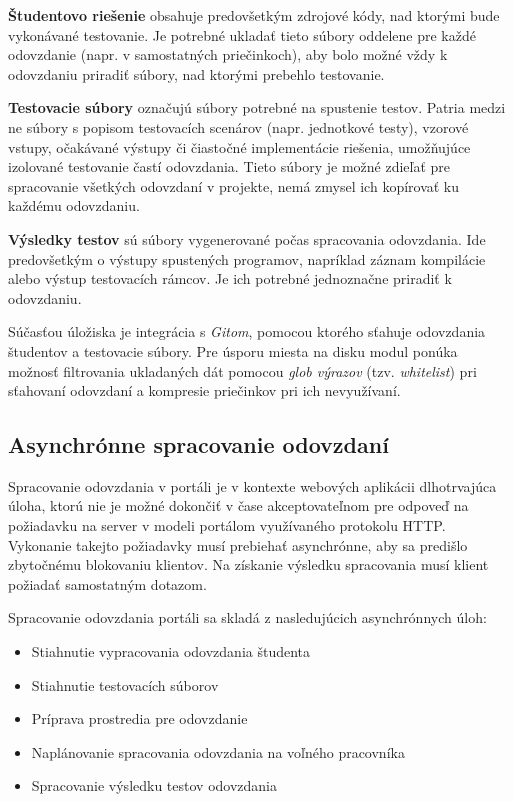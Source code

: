 \documentclass[
  digital, %
  twoside, %
  table,   %
  lof,     %
  lot,     %
]{fithesis3}
\begin{document}
\textbf{Študentovo riešenie} obsahuje predovšetkým zdrojové kódy, nad ktorými bude vykonávané testovanie. Je potrebné ukladať tieto súbory oddelene pre každé odovzdanie (napr. v samostatných priečinkoch), aby bolo možné vždy k odovzdaniu priradiť súbory, nad ktorými prebehlo testovanie.

\textbf{Testovacie súbory} označujú súbory potrebné na spustenie testov. Patria medzi ne súbory s popisom testovacích scenárov (napr. jednotkové testy), vzorové vstupy, očakávané výstupy či čiastočné implementácie riešenia, umožňujúce izolované testovanie častí odovzdania. Tieto súbory je možné zdieľať pre spracovanie všetkých odovzdaní v projekte, nemá zmysel ich kopírovať ku každému odovzdaniu.

\textbf{Výsledky testov} sú súbory vygenerované počas spracovania odovzdania. Ide predovšetkým o výstupy spustených programov, napríklad záznam kompilácie alebo výstup testovacích rámcov. Je ich potrebné jednoznačne priradiť k odovzdaniu.

Súčasťou úložiska je integrácia s \emph{Gitom}, pomocou ktorého sťahuje odovzdania študentov a testovacie súbory. Pre úsporu miesta na disku modul ponúka možnosť filtrovania ukladaných dát pomocou \emph{glob výrazov} (tzv. \emph{whitelist}) pri sťahovaní odovzdaní a kompresie priečinkov pri ich nevyužívaní.

\subsection{Asynchrónne spracovanie odovzdaní}

Spracovanie odovzdania v portáli je v kontexte webových aplikácii dlhotrvajúca úloha, ktorú nie je možné dokončiť v čase akceptovateľnom pre odpoveď na požiadavku na server v modeli portálom využívaného protokolu HTTP. Vykonanie takejto požiadavky musí prebiehať asynchrónne, aby sa predišlo zbytočnému blokovaniu klientov. Na získanie výsledku spracovania musí klient požiadať samostatným dotazom.

Spracovanie odovzdania portáli sa skladá z nasledujúcich asynchrónnych úloh:
\begin{itemize}
    \item Stiahnutie vypracovania odovzdania študenta
    \item Stiahnutie testovacích súborov
    \item Príprava prostredia pre odovzdanie
    \item Naplánovanie spracovania odovzdania na voľného pracovníka
    \item Spracovanie výsledku testov odovzdania
\end{itemize}
\end{document}
